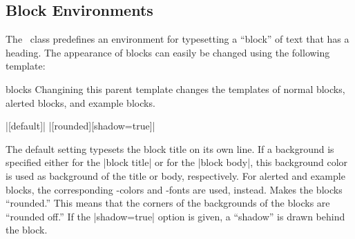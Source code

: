 \subsection{Block Environments}
\label{predefined}

The \beamer\ class predefines an environment for typesetting a
``block'' of text that has a heading. The appearance of blocks can
easily be changed using the following template:

\begin{element}{blocks}\semiyes\no\no
  Changining this parent template changes the templates of normal
  blocks, alerted blocks, and example blocks.

  \example |[default]|
  \example |[rounded][shadow=true]|

  \begin{templateoptions}
    The default setting typesets the block title on its own line. If a
    background is specified either for the |block title| or for the
    |block body|, this background color is used as background of the
    title or body, respectively. For alerted and example blocks, the
    corresponding \beamer-colors and -fonts are used, instead.
    Makes the blocks ``rounded.'' This means that the corners of the
    backgrounds of the blocks are ``rounded off.'' If the
    |shadow=true| option is given, a ``shadow'' is drawn behind the
    block. 
  \end{templateoptions}
\end{element}


